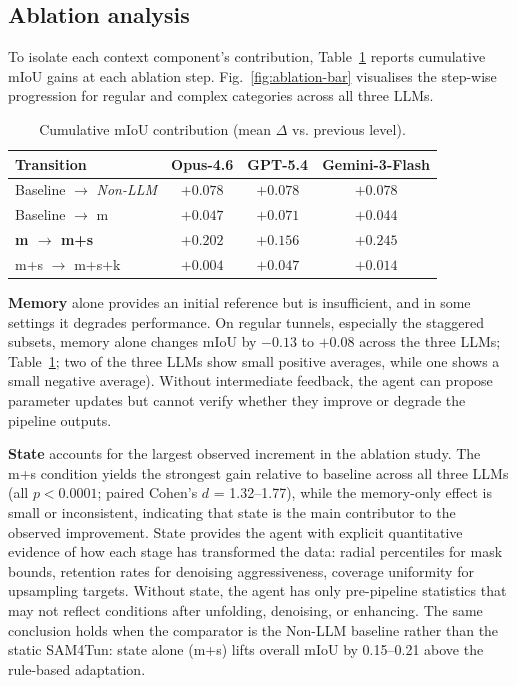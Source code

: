 \documentclass[a4paper,fleqn]{cas-dc}
\begin{document}
{\subsection{Ablation analysis}\label{sec:ablation}

To isolate each context component's contribution, Table~\ref{tab:cumulative_miou} reports cumulative mIoU gains at each ablation step. Fig.~\ref{fig:ablation-bar} visualises the step-wise progression for regular and complex categories across all three LLMs.

\begin{table}[ht]
\caption{Cumulative mIoU contribution (mean $\Delta$ vs. previous level).}\label{tab:cumulative_miou}
\begin{tabular*}{\tblwidth}{@{} l c c c @{}}
\toprule
Transition & Opus-4.6 & GPT-5.4 & Gemini-3-Flash \\
\midrule
Baseline $\rightarrow$ \mbox{\textit{Non-LLM}} & $+0.078$ & $+0.078$ & $+0.078$ \\
Baseline $\rightarrow$ m & $+0.047$ & $+0.071$ & $+0.044$ \\
\textbf{m $\rightarrow$ m+s} & $\mathbf{+0.202}$ & $\mathbf{+0.156}$ & $\mathbf{+0.245}$ \\
m+s $\rightarrow$ m+s+k & $+0.004$ & $+0.047$ & $+0.014$ \\
\bottomrule
\end{tabular*}
\end{table}
\textbf{Memory} alone provides an initial reference but is insufficient, and in some settings it degrades performance. On regular tunnels, especially the staggered subsets, memory alone changes mIoU by $-0.13$ to $+0.08$ across the three LLMs; Table~\ref{tab:cumulative_miou}; two of the three LLMs show small positive averages, while one shows a small negative average). Without intermediate feedback, the agent can propose parameter updates but cannot verify whether they improve or degrade the pipeline outputs.

\textbf{State} accounts for the largest observed increment in the ablation study. The m+s condition yields the strongest gain relative to baseline across all three LLMs (all $p < 0.0001$; paired Cohen's \mbox{$d$} = 1.32--1.77), while the memory-only effect is small or inconsistent, indicating that state is the main contributor to the observed improvement. State provides the agent with explicit quantitative evidence of how each stage has transformed the data: radial percentiles for mask bounds, retention rates for denoising aggressiveness, coverage uniformity for upsampling targets. Without state, the agent has only pre-pipeline statistics that may not reflect conditions after unfolding, denoising, or enhancing. The same conclusion holds when the comparator is the Non-LLM baseline rather than the static SAM4Tun: state alone (m+s) lifts overall mIoU by 0.15--0.21 above the rule-based adaptation.


}
\end{document}
